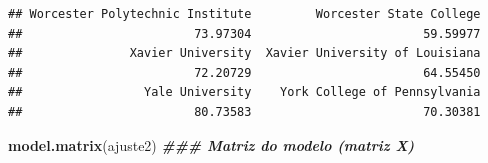 \documentclass[
]{article}
\newenvironment{Shaded}{\begin{snugshade}}{\end{snugshade}}
\newcommand{\DocumentationTok}[1]{\textcolor[rgb]{0.56,0.35,0.01}{\textbf{\textit{#1}}}}
\newcommand{\FunctionTok}[1]{\textcolor[rgb]{0.13,0.29,0.53}{\textbf{#1}}}
\newcommand{\NormalTok}[1]{#1}
\newcommand{\SpecialCharTok}[1]{\textcolor[rgb]{0.81,0.36,0.00}{\textbf{#1}}}
\begin{document}
\begin{Shaded}
\end{Shaded}

\begin{verbatim}
## Worcester Polytechnic Institute         Worcester State College 
##                        73.97304                        59.59977 
##               Xavier University  Xavier University of Louisiana 
##                        72.20729                        64.55450 
##                 Yale University    York College of Pennsylvania 
##                        80.73583                        70.30381
\end{verbatim}

\begin{Shaded}
\begin{Highlighting}[]
\FunctionTok{model.matrix}\NormalTok{(ajuste2) }\DocumentationTok{\#\#\# Matriz do modelo (matriz X)}
\end{Highlighting}
\end{Shaded}
\end{document}
